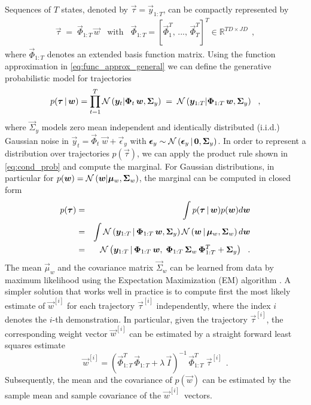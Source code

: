 Sequences of $T$ states, denoted by $\vec \tau = \vec y_{1:T}$, can be compactly represented by 
\begin{eqnarray}
    \vec \tau \;=\; \vec \Phi_{1:T} \, \vec w ~~~~ 
    \text{with} ~~~~ \vec \Phi_{1:T} = \left[\vec \Phi_1^T,\, ...,\, \vec \Phi_T^T\right]^T \in \mathbb{R}^{T D \times J D} ~~,  \label{eq:func_approx_general} 
\end{eqnarray}
where $\vec \Phi_{1:T}$ denotes an extended basis function matrix. 
Using the function approximation in \eqref{eq:func_approx_general} we can define the 
generative probabilistic model for trajectories 
\begin{equation*}
p(\boldsymbol{\tau} \, | \, \boldsymbol{w}) = \prod_{t=1}^T \mathcal{N}\left(\boldsymbol{y}_t \middle| \boldsymbol{\Phi}_{t} \, \boldsymbol{w}, \boldsymbol{\Sigma}_y \right)  \; = \; \mathcal{N}\left(\boldsymbol{y}_{1:T} \middle| \boldsymbol{\Phi}_{1:T} \, \boldsymbol{w}, \boldsymbol{\Sigma}_y \right) ~~,   
\end{equation*}
where $\vec \Sigma_y$ models zero mean independent and identically distributed (i.i.d.) Gaussian noise in $\vec y_t = \vec \Phi_t \; \vec w + \vec \epsilon_y$ 
with $\boldsymbol{\epsilon}_y \sim \mathcal{N}\left(\boldsymbol{\epsilon}_y \, | \, \boldsymbol{0}, \boldsymbol{\Sigma}_y \right)$. 
%
In order to represent a distribution over trajectories $p(\vec \tau)$, 
we can apply the product rule shown in \eqref{eq:cond_prob} and compute the marginal. 
For Gaussian distributions, in particular for $p(\boldsymbol{w}) = \mathcal{N}\left(\boldsymbol{w}\middle| \boldsymbol{\mu}_w, \boldsymbol{\Sigma}_w \right)$, 
the marginal can be computed in closed form 
\begin{eqnarray}
  p(\boldsymbol{\tau}) &=&  \int p(\boldsymbol{\tau} \, | \, \boldsymbol{w}) p(\boldsymbol{w}) d\boldsymbol{w} \nonumber \\
    &=&  \int \mathcal{N}\left(\boldsymbol{y}_{1:T} \, | \,  \boldsymbol{\Phi}_{1:T} \, \boldsymbol{w}, \boldsymbol{\Sigma}_y\right)  \mathcal{N}\left(\boldsymbol{w} \, | \, \boldsymbol{\mu}_w, \boldsymbol{\Sigma}_w\right) d\boldsymbol{w} \nonumber \\
    &=& \mathcal{N}\left(\boldsymbol{y}_{1:T} \, | \, \boldsymbol{\Phi}_{1:T} \, \boldsymbol{w},\; \boldsymbol{\Phi}_{1:T} \, 
      \boldsymbol{\Sigma}_w \, \boldsymbol{\Phi}_{1:T}^T + \boldsymbol{\Sigma}_y\right) ~~. \label{eq:feature_to_traj}
\end{eqnarray}
The mean $\vec \mu_w$ 
and the covariance matrix $\vec \Sigma_w$ can be learned from data by maximum likelihood using the Expectation Maximization (EM) algorithm \cite{Dempster1977}. 
A simpler solution that works well in practice is to compute first the most likely estimate of $\vec w^{[i]}$ for each trajectory $\vec \tau^{[i]}$ independently,  
where the index $i$ denotes the $i$-th demonstration.   
In particular, given the trajectory $\vec \tau^{[i]}$, the corresponding 
weight vector $\vec w^{[i]}$ can be estimated by a straight forward least squares estimate
\begin{equation}
 \vec w^{[i]} = \left(\vec \Phi_{1:T}^T \, \vec \Phi_{1:T} + \lambda \, \vec I\right)^{-1} \, \vec \Phi_{1:T}^T \; \vec \tau^{[i]} ~~. \label{eq:lin_reg_traj}
\end{equation}
Subsequently, the mean and the covariance of $p(\vec w)$ can be estimated 
by the sample mean and sample covariance of the $\vec w^{[i]}\,$ vectors. 

